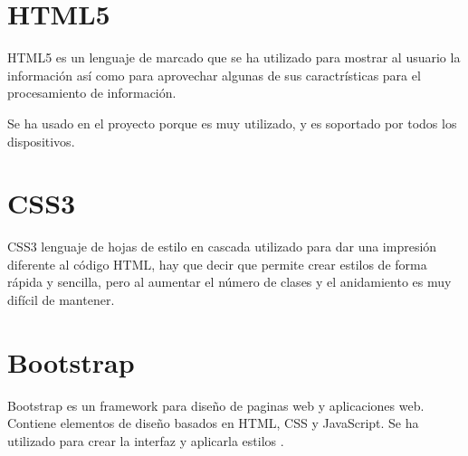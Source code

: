 \section{HTML5}\label{HTML5}

HTML5 es un lenguaje de marcado que se ha utilizado para mostrar al usuario la información así como para aprovechar algunas de sus caractrísticas para el procesamiento de información.

Se ha usado en el proyecto porque es muy utilizado, y es soportado por todos los dispositivos.

\section{CSS3}\label{CSS3}

CSS3 lenguaje de hojas de estilo en cascada utilizado para dar una impresión diferente al código HTML, hay que decir que permite crear estilos de forma rápida y sencilla, pero al aumentar el número de clases y el anidamiento es muy difícil de mantener. 
 
\section{Bootstrap}\label{bootstrap}

Bootstrap es un framework para diseño de paginas web y aplicaciones web. Contiene elementos de diseño basados en HTML, CSS y JavaScript. Se ha utilizado para crear la interfaz y aplicarla estilos \cite{bootstrapbib}. 

